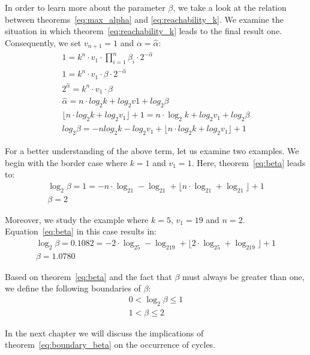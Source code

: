 \documentclass{SciPress_2015}
\begin{document}
\newpage
\par\noindent
In order to learn more about the parameter $\beta$, we take a look at the relation between theorems~\ref{eq:max_alpha} and \ref{eq:reachability_k}. We examine the situation in which theorem~\ref{eq:reachability_k} leads to the final result one. Consequently, we set $v_{n+1}=1$ and $\alpha=\hat\alpha$:
\begin{equation}
	\label{eq:beta}
	\begin{array}{l}
	1=k^n\cdot v_1\cdot\prod_{i=1}^{n}\beta_i\cdot2^{-\hat\alpha}\\
	1=k^n\cdot v_1\cdot\beta\cdot2^{-\hat\alpha}\\
	2^{\hat\alpha}=k^n\cdot v_1\cdot\beta\\
	\hat\alpha=n\cdot log_2k+log_2v1+log_2\beta\\
	\lfloor n\cdot log_2k+log_2v_1\rfloor+1=n\cdot \log_2k+log_2v_1+log_2\beta\\
	log_2\beta=-n log_2k-log_2v_1+\lfloor n\cdot log_2k+log_2v_1\rfloor+1
	\end{array}
\end{equation}

For a better understanding of the above term, let us examine two examples. We begin with the border case where $k=1$ and $v_1=1$. Here, theorem~\ref{eq:beta} leads to:
\[
\begin{array}{c}
\log_2\beta=1=-n\cdot\log_21-\log_21+\lfloor n\cdot\log_21+\log_21\rfloor+1\\
\beta=2
\end{array}
\]

Moreover, we study the example where $k=5$, $v_1=19$ and $n=2$. Equation~\ref{eq:beta} in this case results in:
\[
\begin{array}{c}
\log_2\beta=0.1082=-2\cdot\log_25-\log_219+\lfloor 2\cdot\log_25+\log_219\rfloor+1\\
\beta=1.0780
\end{array}
\]

Based on theorem~\ref{eq:beta} and the fact that $\beta$ must always be greater than one, we define the following boundaries of $\beta$:
\begin{equation}
\label{eq:boundary_beta}
\begin{array}{c}
0<\log_2\beta\le1\\
1<\beta\le2
\end{array}
\end{equation}

In the next chapter we will discuss the implications of theorem~\ref{eq:boundary_beta} on the occurrence of cycles.
\end{document}
